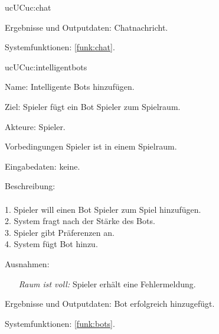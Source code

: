 \begin{description}[leftmargin=5em, style=sameline]
\begin{lhp}{uc}{UC}{uc:chat}
\begin{itemize}
			\end{itemize}
    	\item [Ergebnisse und Outputdaten:] Chatnachricht.
    	\item [Systemfunktionen:] \ref{funk:chat}.
    \end{lhp}


    \begin{lhp}{uc}{UC}{uc:intelligentbots}
    	\item [Name:] Intelligente Bots hinzufügen.
    	\item [Ziel:] Spieler fügt ein Bot Spieler zum Spielraum.
    	\item [Akteure:] Spieler.
    	\item [Vorbedingungen] Spieler ist in einem Spielraum. 
      	\item [Eingabedaten:] keine.
    	\item [Beschreibung:] \hfill\\ \hfill\\
    	1. Spieler will einen Bot Spieler zum Spiel hinzufügen.\\
    	2. System fragt nach der Stärke des Bots.\\
    	3. Spieler gibt Präferenzen an.\\
    	4. System fügt Bot hinzu.\\
    	\item [Ausnahmen:] \hfill
    	\begin{itemize} 
				\item[] \textit{Raum ist voll:} Spieler erhält eine Fehlermeldung.
				
			\end{itemize} 
    	\item [Ergebnisse und Outputdaten:] Bot erfolgreich hinzugefügt.
    	\item [Systemfunktionen:] \ref{funk:bots}.
    \end{lhp}
    

\end{description}
